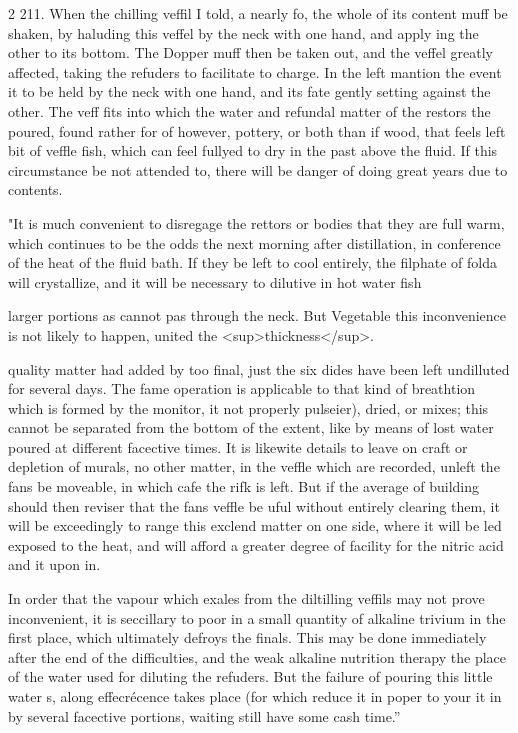 \documentclass[10pt]{article}
\begin{document}
\begin{multicols}{2}
211. When the chilling veffil I told, a nearly fo, the whole of its content muff be shaken, by haluding this veffel by the neck with one hand, and apply ing the other to its bottom. The Dopper muff then be taken out, and the veffel greatly affected, taking the refuders to facilitate to charge. In the left mantion the event it to be held by the neck with one hand, and its fate gently setting against the other. The veff fits into which the water and refundal matter of the restors the poured, found rather for of however, pottery, or both than if wood, that feels left bit of veffle fish, which can feel fullyed to dry in the past above the fluid. If this circumstance be not attended to, there will be danger of doing great years due to contents.

"It is much convenient to disregage the rettors or bodies that they are full warm, which continues to be the odds the next morning after distillation, in conference of the heat of the fluid bath. If they be left to cool entirely, the filphate of folda will crystallize, and it will be necessary to dilutive in hot water fish

larger portions as cannot pas through the neck. But Vegetable this inconvenience is not likely to happen, united the \textless{}sup\textgreater{}thickness\textless{}/sup\textgreater{}.

quality matter had added by too final, just the six dides have been left undilluted for several days. The fame operation is applicable to that kind of breathtion which is formed by the monitor, it not properly pulseier), dried, or mixes; this cannot be separated from the bottom of the extent, like by means of lost water poured at different facective times. It is likewite details to leave on craft or depletion of murals, no other matter, in the veffle which are recorded, unleft the fans be moveable, in which cafe the rifk is left. But if the average of building should then reviser that the fans veffle be uful without entirely clearing them, it will be exceedingly to range this exclend matter on one side, where it will be led exposed to the heat, and will afford a greater degree of facility for the nitric acid and it upon in.

In order that the vapour which exales from the diltilling veffils may not prove inconvenient, it is seccillary to poor in a small quantity of alkaline trivium in the first place, which ultimately defroys the finals. This may be done immediately after the end of the difficulties, and the weak alkaline nutrition therapy the place of the water used for diluting the refuders. But the failure of pouring this little water s, along effecrécence takes place (for which reduce it in poper to your it in by several facective portions, waiting still have some cash time.”


\end{multicols}
\end{document}

